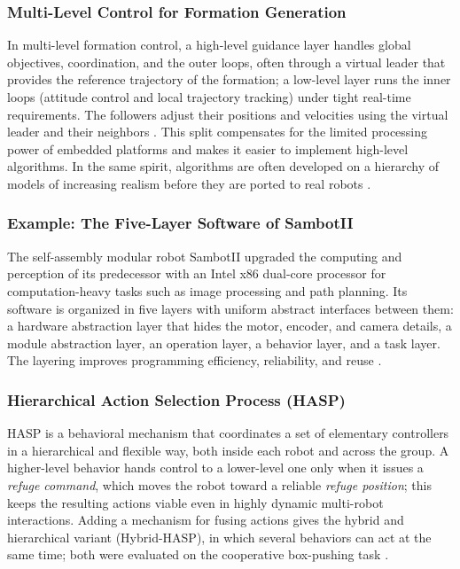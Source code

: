 \subsubsection{Multi-Level Control for Formation Generation}

In multi-level formation control, a high-level guidance layer handles global
objectives, coordination, and the outer loops, often through a virtual leader
that provides the reference trajectory of the formation; a low-level layer runs
the inner loops (attitude control and local trajectory tracking) under tight
real-time requirements. The followers adjust their positions and velocities using
the virtual leader and their neighbors \cite{liu2019distributed,rezaei2025novel}. This split
compensates for the limited processing power of embedded platforms and makes it
easier to implement high-level algorithms. In the same spirit, algorithms are
often developed on a hierarchy of models of increasing realism before they are
ported to real robots \cite{hamann2018swarm}.

\subsubsection{Example: The Five-Layer Software of SambotII}

The self-assembly modular robot SambotII upgraded the computing and perception
of its predecessor with an Intel x86 dual-core processor for computation-heavy
tasks such as image processing and path planning. Its software is organized in
five layers with uniform abstract interfaces between them: a hardware
abstraction layer that hides the motor, encoder, and camera details, a module
abstraction layer, an operation layer, a behavior layer, and a task layer. The
layering improves programming efficiency, reliability, and reuse
\cite{tan2018sambotii}.

\subsubsection{Hierarchical Action Selection Process (HASP)}

HASP is a behavioral mechanism that coordinates a set of elementary controllers
in a hierarchical and flexible way, both inside each robot and across the
group. A higher-level behavior hands control to a lower-level one only when it
issues a \emph{refuge command}, which moves the robot toward a reliable
\emph{refuge position}; this keeps the resulting actions viable even in highly
dynamic multi-robot interactions. Adding a mechanism for fusing actions gives
the hybrid and hierarchical variant (Hybrid-HASP), in which several behaviors
can act at the same time; both were evaluated on the cooperative box-pushing
task \cite{tan2016handbook}.

